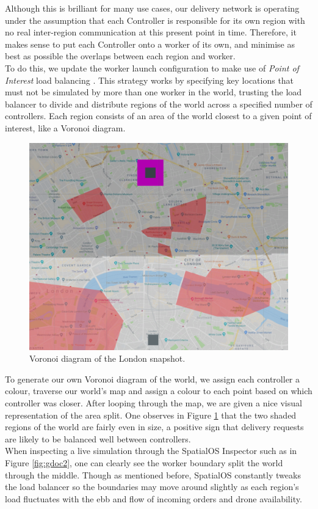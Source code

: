 \documentclass[a4paper,12pt,titlepage]{article}
\begin{document}
Although this is brilliant for many use cases, our delivery network is operating under the assumption that each Controller is responsible for its own region with no real inter-region communication at this present point in time. Therefore, it makes sense to put each Controller onto a worker of its own, and minimise as best as possible the overlaps between each region and worker.\\

To do this, we update the worker launch configuration to make use of \textit{Point of Interest} load balancing \cite{ImprobableWorldsLtd.2018d}. This strategy works by specifying key locations that must not be simulated by more than one worker in the world, trusting the load balancer to divide and distribute regions of the world across a specified number of controllers. Each region consists of an area of the world closest to a given point of interest, like a Voronoi diagram.

\begin{figure}[!hbpt]
  \center
  \includegraphics[width=0.7\linewidth]{img/smol.png}
  \caption{Voronoi diagram of the London snapshot.}
  \label{fig:smol}
\end{figure}

To generate our own Voronoi diagram of the world, we assign each controller a colour, traverse our world's map and assign a colour to each point based on which controller was closer. After looping through the map, we are given a nice visual representation of the area split. One observes in Figure \ref{fig:smol} that the two shaded regions of the world are fairly even in size, a positive sign that delivery requests are likely to be balanced well between controllers.\\

When inspecting a live simulation through the SpatialOS Inspector such as in Figure \ref{fig:gdoc2}, one can clearly see the worker boundary split the world through the middle. Though as mentioned before, SpatialOS constantly tweaks the load balancer so the boundaries may move around slightly as each region's load fluctuates with the ebb and flow of incoming orders and drone availability.
\end{document}
